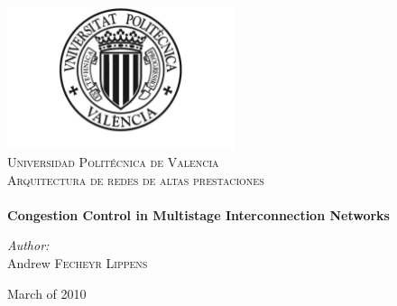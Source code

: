 \begin{titlepage}
\begin{center}
 
\includegraphics[width=0.50\textwidth]{../shared/figures/logoUPV.pdf}\\[1cm]
\textsc{\LARGE Universidad Polit\'ecnica de Valencia}\\[1.4cm]
\textsc{\Large Arquitectura de redes de altas prestaciones}\\[1.4cm]
 
 
\HRule \\[0.4cm]
{ \huge \bfseries Congestion Control in Multistage Interconnection Networks}
\HRule \\[1.4cm]
 
\begin{flushleft} \large
\emph{Author:}\\
Andrew \textsc{Fecheyr} \textsc{Lippens}
\end{flushleft}

\vfill
 
{\large March of 2010}
 
\end{center}
\end{titlepage}